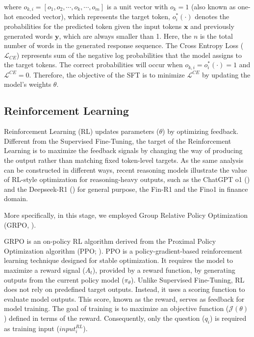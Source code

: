 where $o_{k,i} = [o_1, o_2, \cdots, o_k, \cdots, o_m]$ is a unit vector with $o_k = 1$ (also known as one-hot encoded vector), which represents the target token, $o^*_i(\cdot)$ denotes the probabilities for the predicted token given the input tokens $\bm{x}$ and previously generated words $\bm{y}$, which are always smaller than 1. Here, the $n$ is the total number of words in the generated response sequence. The Cross Entropy Loss ($\mathcal{L}_{CE}$) represents sum of the negative log probabilities that the model assigns to the target tokens. The correct probabilities will occur when $o_{k,i}=o^*_i(\cdot) = 1$ and $\mathcal{L}^{CE}=0$. Therefore, the objective of the SFT is to minimize $\mathcal{L}^{CE}$ by updating the model's weights $\theta$.




\subsection*{Reinforcement Learning}\label{ch2:sec:model_train:rl}


Reinforcement Learning (RL) updates parameters ($\theta$) by optimizing feedback. Different from the Supervised Fine-Tuning, the target of the Reinforcement Learning is to maximize the feedback signals by changing the way of producing the output rather than matching fixed token-level targets. As the same analysis can be constructed in different ways, recent reasoning models illustrate the value of RL-style optimization for reasoning-heavy outputs, such as the ChatGPT o1 (\cite{jaech2024openai}) and the Deepseek-R1 (\cite{guo2025deepseek}) for general purpose, the Fin-R1 \cite{liu2025fin} and the Fino1 \cite{qian2025fino1} in finance domain.



More specifically, in this stage, we employed Group Relative Policy Optimization (GRPO, \cite{shao2024deepseekmath}).


GRPO is an on-policy RL algorithm derived from the Proximal Policy Optimization algorithm (PPO; \cite{schulman2017proximal}). PPO is a policy-gradient-based reinforcement learning technique designed for stable optimization. It requires the model to maximize a reward signal ($A_t$), provided by a reward function, by generating outputs from the current policy model ($\pi_{\theta}$). Unlike Supervised Fine-Tuning, RL does not rely on predefined target outputs. Instead, it uses a scoring function to evaluate model outputs. This score, known as the reward, serves as feedback for model training. The goal of training is to maximize an objective function ($\mathcal{J}(\theta)$) defined in terms of the reward. Consequently, only the question ($q_i$) is required as training input ($input^{RL}_i$).


